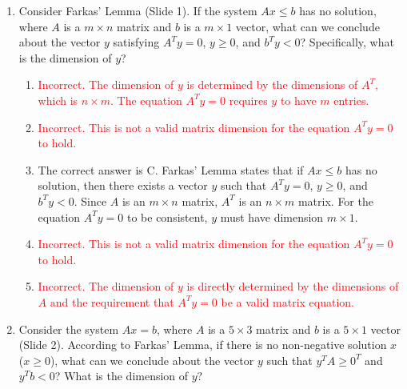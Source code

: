 \documentclass{article}%
\newcommand{\incorrect}[1]{\textcolor{red}{#1}}
\begin{document}
\begin{enumerate}
\begin{enumerate}
\begin{enumerate}%
\item \incorrect{Variant (i) deals with $Ax = b$ and $x \ge 0$.}%
\item \incorrect{Variant (ii) deals with $Ax \le b$ and $x \ge 0$.}%
\item Variant (iii) explicitly deals with the existence of a solution to $Ax \le b$ without any restriction on the sign of $x$.%
\item \incorrect{Both (i) and (ii) impose non-negativity constraints on $x$.}%
\item \incorrect{This is incorrect; variant (iii) directly addresses this case.}%
\end{enumerate}%
\vspace{0.5em}%
\end{enumerate}%
\item Consider Farkas' Lemma (Slide 1).  If the system $Ax \le b$ has no solution, where $A$ is a $m \times n$ matrix and $b$ is a $m \times 1$ vector, what can we conclude about the vector $y$ satisfying $A^T y = 0$, $y \ge 0$, and $b^T y < 0$?  Specifically, what is the dimension of $y$?%
\begin{enumerate}%
\item \incorrect{Incorrect. The dimension of $y$ is determined by the dimensions of $A^T$, which is $n \times m$.  The equation $A^T y = 0$ requires $y$ to have $m$ entries.}%
\item \incorrect{Incorrect.  This is not a valid matrix dimension for the equation $A^T y = 0$ to hold.}%
\item The correct answer is C.  Farkas' Lemma states that if $Ax \le b$ has no solution, then there exists a vector $y$ such that $A^T y = 0$, $y \ge 0$, and $b^T y < 0$. Since $A$ is an $m \times n$ matrix, $A^T$ is an $n \times m$ matrix.  For the equation $A^T y = 0$ to be consistent, $y$ must have dimension $m \times 1$.%
\item \incorrect{Incorrect. This is not a valid matrix dimension for the equation $A^T y = 0$ to hold.}%
\item \incorrect{Incorrect. The dimension of $y$ is directly determined by the dimensions of $A$ and the requirement that $A^T y = 0$ be a valid matrix equation.}%
\end{enumerate}%
\vspace{1em}%
\item Consider the system $Ax = b$, where $A$ is a $5 \times 3$ matrix and $b$ is a $5 \times 1$ vector (Slide 2).  According to Farkas' Lemma, if there is no non-negative solution $x$ ($x \ge 0$), what can we conclude about the vector $y$ such that $y^T A \ge 0^T$ and $y^T b < 0$? What is the dimension of $y$?%

\end{enumerate}
\end{document}
